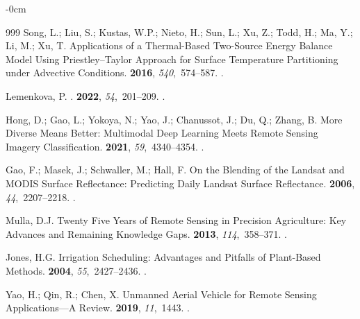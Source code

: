\documentclass[land,review,accept,pdftex,oneauthor]{Definitions/mdpi}
\begin{document}
\begin{adjustwidth}{-\extralength}{0cm}
\begin{thebibliography}{999}
Song, L.; Liu, S.; Kustas, W.P.; Nieto, H.; Sun, L.; Xu, Z.; Todd, H.; Ma, Y.;
  Li, M.; Xu, T.
\newblock Applications of a Thermal-Based Two-Source Energy Balance Model Using
  {Priestley--Taylor} Approach for Surface Temperature Partitioning under
  Advective Conditions.
 {\bf 2016}, {\em 540},~574--587.
.

Lemenkova, P.
.
 {\bf 2022}, {\em
  54},~201--209.
.

Hong, D.; Gao, L.; Yokoya, N.; Yao, J.; Chanussot, J.; Du, Q.; Zhang, B.
\newblock More Diverse Means Better: Multimodal Deep Learning Meets Remote
  Sensing Imagery Classification.
 {\bf 2021},
  {\em 59},~4340--4354.
.

Gao, F.; Masek, J.; Schwaller, M.; Hall, F.
\newblock On the Blending of the {Landsat} and {MODIS} Surface Reflectance:
  Predicting Daily {Landsat} Surface Reflectance.
 {\bf 2006},
  {\em 44},~2207--2218.
.

Mulla, D.J.
\newblock Twenty Five Years of Remote Sensing in Precision Agriculture: Key
  Advances and Remaining Knowledge Gaps.
 {\bf 2013}, {\em 114},~358--371.
.

Jones, H.G.
\newblock Irrigation Scheduling: Advantages and Pitfalls of Plant-Based
  Methods.
 {\bf 2004}, {\em
  55},~2427--2436.
.

Yao, H.; Qin, R.; Chen, X.
\newblock Unmanned Aerial Vehicle for Remote Sensing Applications---A Review.
 {\bf 2019}, {\em 11},~1443.
.


\end{thebibliography}
\end{adjustwidth}
\end{document}
